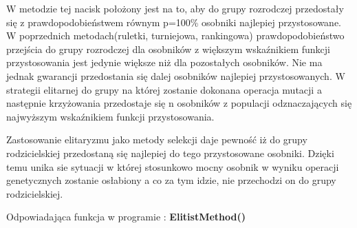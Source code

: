 W metodzie tej nacisk położony jest na to, aby do grupy rozrodczej przedostały się z prawdopodobieństwem równym p=100\% osobniki najlepiej przystosowane. W poprzednich metodach(ruletki, turniejowa, rankingowa) prawdopodobieństwo przejścia do grupy rozrodczej dla osobników z większym wskaźnikiem funkcji przystosowania jest jedynie większe niż dla pozostałych osobników. Nie ma jednak gwarancji przedostania się dalej osobników najlepiej przystosowanych. W strategii elitarnej do grupy na której zostanie dokonana operacja mutacji a następnie krzyżowania przedostaje się n osobników z populacji odznaczających się najwyższym wskaźnikiem funkcji przystosowania.\\
\par
Zastosowanie elitaryzmu jako metody selekcji daje pewność iż do grupy rodzicielskiej przedostaną się najlepiej do tego przystosowane osobniki. Dzięki temu unika sie sytuacji w której stosunkowo mocny osobnik w wyniku operacji genetycznych zostanie osłabiony a co za tym idzie, nie przechodzi on do grupy rodzicielskiej.\\
\par
Odpowiadająca funkcja w programie : \textbf{ElitistMethod()}

